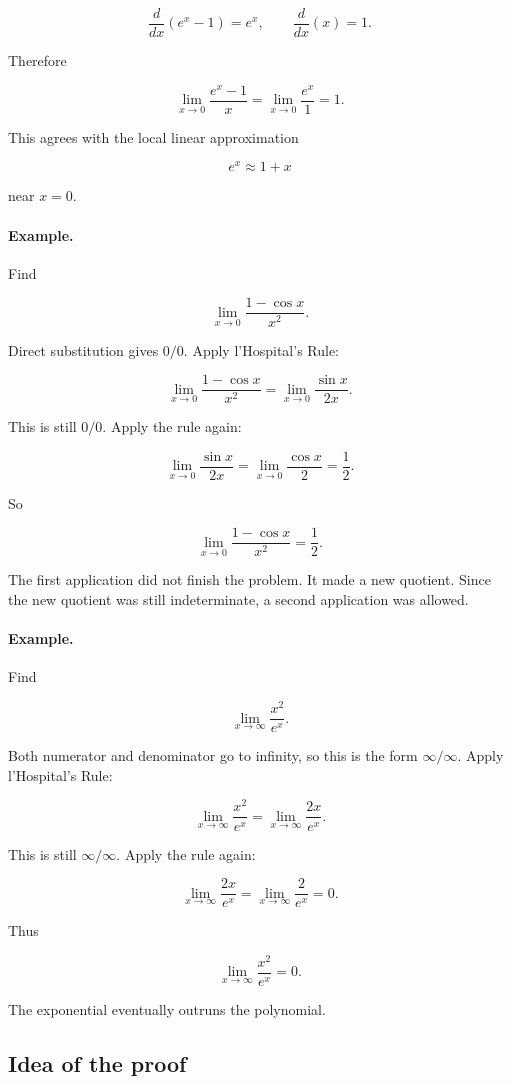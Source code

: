 \[
\frac{d}{dx}(e^x-1)=e^x,
\qquad
\frac{d}{dx}(x)=1.
\]

Therefore

\[
\lim_{x\to0}\frac{e^x-1}{x}
=
\lim_{x\to0}\frac{e^x}{1}
=
1.
\]

This agrees with the local linear approximation

\[
e^x\approx1+x
\]

near \(x=0\).

\paragraph{Example.}
Find

\[
\lim_{x\to0}\frac{1-\cos x}{x^2}.
\]

Direct substitution gives \(0/0\).  Apply l'Hospital's Rule:

\[
\lim_{x\to0}\frac{1-\cos x}{x^2}
=
\lim_{x\to0}\frac{\sin x}{2x}.
\]

This is still \(0/0\).  Apply the rule again:

\[
\lim_{x\to0}\frac{\sin x}{2x}
=
\lim_{x\to0}\frac{\cos x}{2}
=
\frac12.
\]

So

\[
\boxed{
\lim_{x\to0}\frac{1-\cos x}{x^2}=\frac12.
}
\]

The first application did not finish the problem.  It made a new quotient.  Since the
new quotient was still indeterminate, a second application was allowed.

\paragraph{Example.}
Find

\[
\lim_{x\to\infty}\frac{x^2}{e^x}.
\]

Both numerator and denominator go to infinity, so this is the form \(\infty/\infty\).
Apply l'Hospital's Rule:

\[
\lim_{x\to\infty}\frac{x^2}{e^x}
=
\lim_{x\to\infty}\frac{2x}{e^x}.
\]

This is still \(\infty/\infty\).  Apply the rule again:

\[
\lim_{x\to\infty}\frac{2x}{e^x}
=
\lim_{x\to\infty}\frac{2}{e^x}
=
0.
\]

Thus

\[
\boxed{
\lim_{x\to\infty}\frac{x^2}{e^x}=0.
}
\]

The exponential eventually outruns the polynomial.

\subsection{Idea of the proof}
\label{subsec:lhospital-proof-idea}

